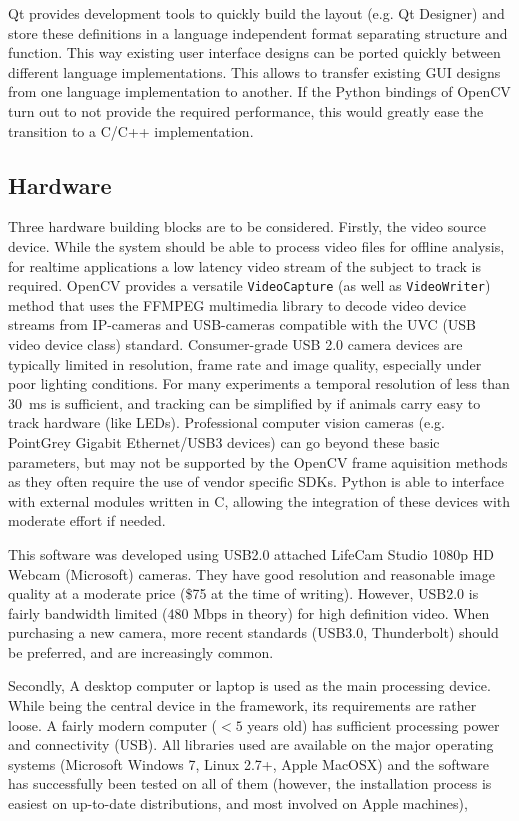 Qt provides development tools to quickly build the layout (e.g. Qt Designer) and store these definitions in a language independent format separating structure and function. This way existing user interface designs can be ported quickly between different language implementations. This allows to transfer existing GUI designs from one language implementation to another. If the Python bindings of OpenCV turn out to not provide the required performance, this would greatly ease the transition to a C/C++ implementation.

	\subsection{Hardware}
	Three hardware building blocks are to be considered. Firstly, the video source device. While the system should be able to process video files for offline analysis, for realtime applications a low latency video stream of the subject to track is required. OpenCV provides a versatile \texttt{VideoCapture} (as well as \texttt{VideoWriter}) method that uses the FFMPEG multimedia library to decode video device streams from IP-cameras and USB-cameras compatible with the UVC (USB video device class) standard. Consumer-grade USB 2.0 camera devices are typically limited in resolution, frame rate and image quality, especially under poor lighting conditions. For many experiments a temporal resolution of less than \SI{30}{\milli\second} is sufficient, and tracking can be simplified by if animals carry easy to track hardware (like LEDs). Professional computer vision cameras (e.g. PointGrey Gigabit Ethernet/USB3 devices) can go beyond these basic parameters, but may not be supported by the OpenCV frame aquisition methods as they often require the use of vendor specific SDKs. Python is able to interface with external modules written in C, allowing the integration of these devices with moderate effort if needed.
	
This software was developed using USB2.0 attached LifeCam Studio 1080p HD Webcam (Microsoft) cameras. They have good resolution and reasonable image quality at a moderate price (\$75 at the time of writing). However, USB2.0 is fairly bandwidth limited (480 Mbps in theory) for high definition video. When purchasing a new camera, more recent standards (USB3.0, Thunderbolt) should be preferred, and are increasingly common.
	
Secondly, A desktop computer or laptop is used as the main processing device. While being the central device in the framework, its requirements are rather loose. A fairly modern computer ($<5$ years old) has sufficient processing power and connectivity (USB). All libraries used are available on the major operating systems (Microsoft Windows 7, Linux 2.7+, Apple MacOSX) and the software has successfully been tested on all of them (however, the installation process is easiest on up-to-date distributions, and most involved on Apple machines),


